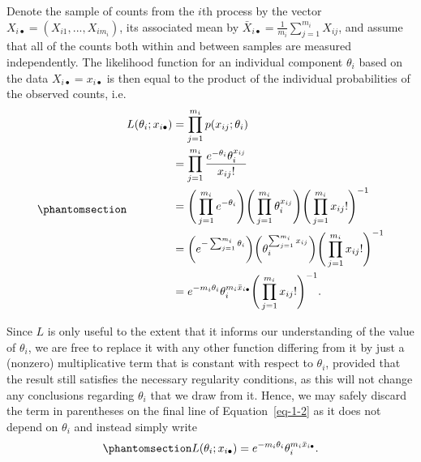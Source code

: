 \documentclass[
  12pt]{article}
\begin{document}
Denote the sample of counts from the \(i\)th process by the vector
\(X_{i\bullet} = (X_{i1}, ..., X_{im_i})\), its associated mean by
\(\bar{X}_{i \bullet} = \frac{1}{m_i} \sum_{j = 1}^{m_i} X_{ij}\), and
assume that all of the counts both within and between samples are
measured independently. The likelihood function for an individual
component \(\theta_i\) based on the data \(X_{i\bullet} = x_{i\bullet}\)
is then equal to the product of the individual probabilities of the
observed counts, i.e.~\begin{equation}\phantomsection\label{eq-1-2}{
\begin{aligned}
L(\theta_i; x_{i\bullet}) &= \prod_{j=1}^{m_i} p(x_{ij}; \theta_i) \\
                          &= \prod_{j=1}^{m_i} \frac{e^{-\theta_i} \theta_i ^ {x_{ij}}}{x_{ij}!} \\
                          &= \Bigg(\prod_{j=1}^{m_i} e^{-\theta_i}\Bigg) \Bigg(\prod_{j=1}^{m_i}\theta_i^{x_{ij}}\Bigg) \Bigg(\prod_{j=1}^{m_i} x_{ij}!\Bigg)^{-1} \\
                          &= \bigg(e^{-\sum_{j=1}^{m_i}\theta_i}\bigg) \bigg(\theta_i^{\sum_{j=1}^{m_i}x_{ij}}\bigg) \Bigg(\prod_{j=1}^{m_i} x_{ij}!\Bigg)^{-1} \\
                          &= e^{-m_i\theta_i}\theta_i^{m_i\bar{x}_{i\bullet}}\Bigg(\prod_{j=1}^{m_i} x_{ij}!\Bigg)^{-1}.
\end{aligned}
}\end{equation}

Since \(L\) is only useful to the extent that it informs our
understanding of the value of \(\theta_i\), we are free to replace it
with any other function differing from it by just a (nonzero)
multiplicative term that is constant with respect to \(\theta_i\),
provided that the result still satisfies the necessary regularity
conditions, as this will not change any conclusions regarding
\(\theta_i\) that we draw from it. Hence, we may safely discard the term
in parentheses on the final line of Equation~\ref{eq-1-2} as it does not
depend on \(\theta_i\) and instead simply write
\begin{equation}\phantomsection\label{eq-1-3}{
L(\theta_i; x_{i\bullet}) = e^{-m_i\theta_i}\theta_i^{m_i\bar{x}_{i\bullet}}.
}\end{equation}
\end{document}
